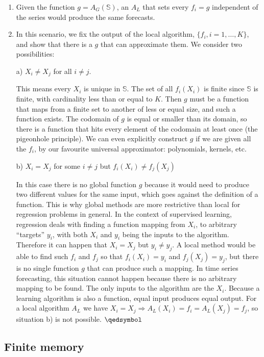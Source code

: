 \documentclass[a4paper]{article}
\theoremstyle{custom}
\begin{document}
\begin{enumerate}
\item Given the function $g=A_G(\mathbb{S})$, an $A_L$ that sets every $f_i = g$ independent of the series would
produce the same forecasts.
\item In this scenario, we fix the output of the local algorithm, $\{f_i, i=1,\dots,K\}$, and show that there is a $g$ that can approximate them.
We consider two possibilities:

a) $X_i \neq X_j$ for all $i \neq j$.

This means every $X_i$ is unique in $\mathbb{S}$. The set of all $f_i(X_i)$ is finite since $\mathbb{S}$ is finite, with cardinality less than or equal to $K$. Then $g$ must be a function that maps from a finite set to another of less or equal size, and such a function exists. The codomain of $g$ is equal or smaller than its domain, so there is a function that hits every element of the codomain at least once (the pigeonhole principle). We can even explicitly construct $g$ if we are given all the $f_i$, by our favourite universal approximator: polynomials, kernels, etc.

b) $X_i = X_j$ for some $i \neq j$ but $f_i(X_i) \neq f_j(X_j)$

In this case there is no global function $g$ because it would need to produce two different values for the same input, which goes against the definition of a function.
This is why global methods are more restrictive than local for regression problems in general. In the context of supervised learning, regression deals with finding a function mapping from $X_i$, to arbitrary ``targets'' $y_i$, with both $X_i$ and $y_i$ being the inputs to the algorithm. Therefore it can happen that $X_i = X_j$ but $y_i \neq y_j$. A local method would be able to find such $f_i$ and $f_j$ so that $f_i(X_i) = y_i$ and $f_j(X_j) = y_j$, but there is no single function $g$ that can produce such a mapping.
 In time series forecasting, this situation cannot happen because there is no arbitrary mapping to be found. The only inputs to the algorithm are the $X_i$. Because a learning algorithm is also a function, equal input produces equal output. For a local algorithm $A_L$ we have $X_i = X_j \Rightarrow A_L(X_i) = f_i = A_L(X_j) = f_j$, so situation b) is not possible. $\qedsymbol$
\end{enumerate}

\subsection{Finite memory}
\label{sec:finitemem}
\end{document}
